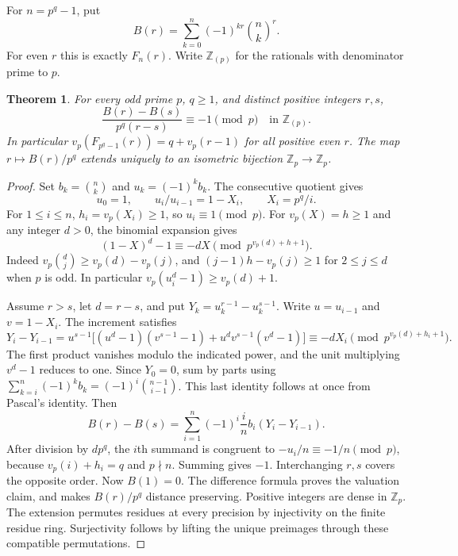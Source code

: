 \documentclass[11pt]{article}
\newtheorem{theorem}{Theorem}
\begin{document}
For $n=p^q-1$, put
\[
 B(r)=\sum_{k=0}^n(-1)^{kr}\binom nk^r .
\]
For even $r$ this is exactly $F_n(r)$. Write $\mathbb Z_{(p)}$ for the rationals with denominator prime to $p$.
\begin{theorem}\label{main}
For every odd prime $p$, $q\ge1$, and distinct positive integers $r,s$,
\[
 \frac{B(r)-B(s)}{p^q(r-s)}\equiv-1\pmod p\quad\text{in }\mathbb Z_{(p)}.
\]
In particular $v_p(F_{p^q-1}(r))=q+v_p(r-1)$ for all positive even $r$. The map $r\mapsto B(r)/p^q$ extends uniquely to an isometric bijection $\mathbb Z_p\to\mathbb Z_p$.
\end{theorem}
\begin{proof}
Set $b_k=\binom nk$ and $u_k=(-1)^k b_k$. The consecutive quotient gives
\[
 u_0=1,\qquad u_i/u_{i-1}=1-X_i,\qquad X_i=p^q/i.
\]
For $1\le i\le n$, $h_i=v_p(X_i)\ge1$, so $u_i\equiv1\pmod p$. For $v_p(X)=h\ge1$ and any integer $d>0$, the binomial expansion gives
\begin{equation}\label{linear}
 (1-X)^d-1\equiv-dX\pmod{p^{v_p(d)+h+1}}.
\end{equation}
Indeed $v_p\binom dj\ge v_p(d)-v_p(j)$, and $(j-1)h-v_p(j)\ge1$ for $2\le j\le d$ when $p$ is odd. In particular $v_p(u_i^d-1)\ge v_p(d)+1$.

Assume $r>s$, let $d=r-s$, and put $Y_k=u_k^{r-1}-u_k^{s-1}$. Write $u=u_{i-1}$ and $v=1-X_i$. The increment satisfies
\[
 Y_i-Y_{i-1}=u^{s-1}\big[(u^d-1)(v^{s-1}-1)+u^d v^{s-1}(v^d-1)\big]
 \equiv-dX_i\pmod{p^{v_p(d)+h_i+1}}.
\]
The first product vanishes modulo the indicated power, and the unit multiplying $v^d-1$ reduces to one. Since $Y_0=0$, sum by parts using $\sum_{k=i}^n(-1)^k b_k=(-1)^i\binom{n-1}{i-1}$. This last identity follows at once from Pascal's identity. Then
\[
 B(r)-B(s)=\sum_{i=1}^n(-1)^i\frac{i}{n}b_i(Y_i-Y_{i-1}).
\]
After division by $d p^q$, the $i$th summand is congruent to $-u_i/n\equiv-1/n\pmod p$, because $v_p(i)+h_i=q$ and $p\nmid n$. Summing gives $-1$. Interchanging $r,s$ covers the opposite order. Now $B(1)=0$. The difference formula proves the valuation claim, and makes $B(r)/p^q$ distance preserving. Positive integers are dense in $\mathbb Z_p$. The extension permutes residues at every precision by injectivity on the finite residue ring. Surjectivity follows by lifting the unique preimages through these compatible permutations.
\end{proof}
\end{document}
